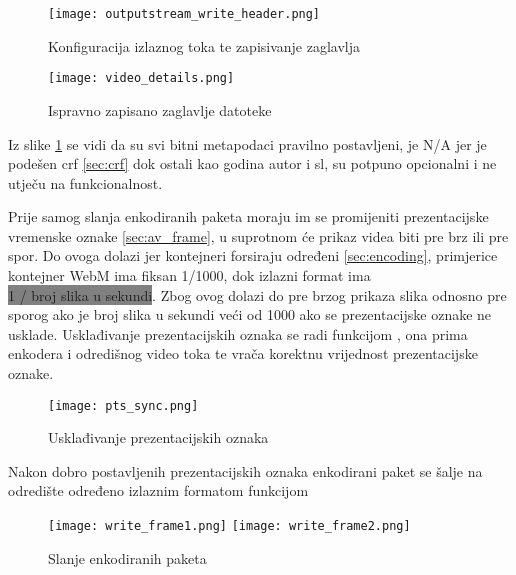 \begin{figure}[h]
  \texttt{[image: outputstream\_write\_header.png]}
  \caption{Konfiguracija izlaznog toka te zapisivanje zaglavlja}
\end{figure}

\begin{figure}[h]
  \centering
  \texttt{[image: video\_details.png]}
  \caption{Ispravno zapisano zaglavlje datoteke}
  \label{pic:file_props}
\end{figure}
Iz slike \ref{pic:file_props} se vidi da su svi bitni metapodaci pravilno postavljeni,  je N/A jer
je podešen crf \ref{sec:crf} dok ostali kao godina autor i sl, su potpuno opcionalni i ne utječu na funkcionalnost.

\clearpage
{}
Prije samog slanja enkodiranih paketa moraju im se promijeniti prezentacijske vremenske oznake \ref{sec:av_frame}, u
suprotnom će prikaz videa biti pre brz ili pre spor.
\paraBreak
Do ovoga dolazi jer kontejneri forsiraju određeni  \ref{sec:encoding}, primjerice kontejner WebM ima
fiksan  1/1000, \cite{ffmpegBook} dok izlazni format ima \\ 
\colorbox{gray}{1 / broj slika u sekundi}.  Zbog ovog dolazi  do pre brzog prikaza slika odnosno pre sporog ako je broj
slika u sekundi veći od 1000 ako se prezentacijske oznake ne usklade.
\paraBreak
Usklađivanje prezentacijskih oznaka se radi funkcijom , ona prima  enkodera
i  odredišnog video toka te vrača korektnu vrijednost prezentacijske oznake.
\begin{figure}[H]
  \texttt{[image: pts\_sync.png]}
  \caption{Usklađivanje prezentacijskih oznaka}
\end{figure}
\noindent
Nakon dobro postavljenih prezentacijskih oznaka enkodirani paket se šalje na odredište određeno izlaznim formatom
funkcijom 
\begin{figure}[h]
  \texttt{[image: write\_frame1.png]}
  \texttt{[image: write\_frame2.png]}
  \caption{Slanje enkodiranih paketa}
\end{figure}